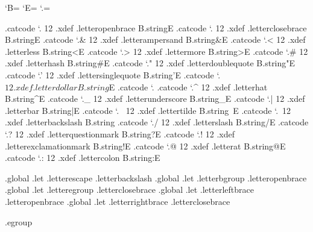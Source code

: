 
\unprotect


\bgroup

\catcode`B=\@@begingroup
\catcode`E=\@@endgroup
\catcode`.=\@@escape

.catcode `.{ 12 .xdef .letteropenbrace       B.string{E
.catcode `.} 12 .xdef .letterclosebrace      B.string}E
.catcode `.& 12 .xdef .letterampersand       B.string&E
.catcode `.< 12 .xdef .letterless            B.string<E
.catcode `.> 12 .xdef .lettermore            B.string>E
.catcode `.# 12 .xdef .letterhash            B.string#E
.catcode `." 12 .xdef .letterdoublequote     B.string"E
.catcode `.' 12 .xdef .lettersinglequote     B.string'E
.catcode `.$ 12 .xdef .letterdollar          B.string$E
.catcode `.%
.catcode `.^ 12 .xdef .letterhat             B.string^E
.catcode `._ 12 .xdef .letterunderscore      B.string_E
.catcode `.| 12 .xdef .letterbar             B.string|E
.catcode `.~ 12 .xdef .lettertilde           B.string~E
.catcode `.\ 12 .xdef .letterbackslash       B.string\E
.catcode `./ 12 .xdef .letterslash           B.string/E
.catcode `.? 12 .xdef .letterquestionmark    B.string?E
.catcode `.! 12 .xdef .letterexclamationmark B.string!E
.catcode `.@ 12 .xdef .letterat              B.string@E
.catcode `.: 12 .xdef .lettercolon           B.string:E

         .global .let .letterescape     .letterbackslash
         .global .let .letterbgroup     .letteropenbrace
         .global .let .letteregroup     .letterclosebrace
         .global .let .letterleftbrace  .letteropenbrace
         .global .let .letterrightbrace .letterclosebrace

.egroup


